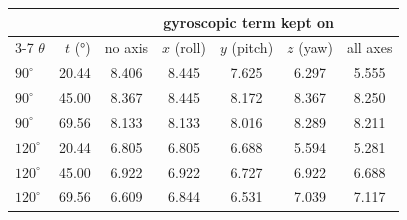 \begin{tabular}{l r ccccc}
  \toprule
  & & \multicolumn{5}{c}{gyroscopic term kept on} \\
  \cmidrule(lr){3-7}
  $\theta$ & $t$ (\si{\degree}) & no axis & $x$ (roll) & $y$ (pitch) & $z$ (yaw) & all axes \\
  \midrule
    $90^\circ$ & 20.44 & 8.406 & 8.445 & 7.625 & 6.297 & 5.555 \\
    $90^\circ$ & 45.00 & 8.367 & 8.445 & 8.172 & 8.367 & 8.250 \\
    $90^\circ$ & 69.56 & 8.133 & 8.133 & 8.016 & 8.289 & 8.211 \\
    \addlinespace
    $120^\circ$ & 20.44 & 6.805 & 6.805 & 6.688 & 5.594 & 5.281 \\
    $120^\circ$ & 45.00 & 6.922 & 6.922 & 6.727 & 6.922 & 6.688 \\
    $120^\circ$ & 69.56 & 6.609 & 6.844 & 6.531 & 7.039 & 7.117 \\
  \bottomrule
\end{tabular}

